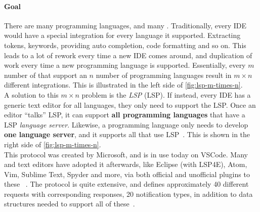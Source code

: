 
\paragraph{Goal}
There are many programming languages, and many .
Traditionally, every \acrshort{IDE} would have a special integration for every language it supported.
Extracting tokens, keywords, providing auto completion, code formatting and so on.
This leads to a lot of rework every time a new \acrshort{IDE} comes around, and duplication of work every time a new programming language is supported.
Essentially, every $m$ number of  that support an $n$ number of programming languages result in $m\times{}n$ different integrations.
This is illustrated in the left side of \cref{fig:lsp-m-times-n}.\\

A solution to this $m\times{}n$ problem is the \textit{\acrlong{LSP}} (\acrshort{LSP}).
If instead, every \acrshort{IDE} has a generic text editor for all languages, they only need to support the \acrshort{LSP}.
Once an editor ``talks'' \acrshort{LSP}, it can support \textbf{all programming languages} that have a \acrshort{LSP} \textit{language server}.
Likewise, a programming language only needs to develop \textbf{one language server}, and it supports all  that use \acrshort{LSP}~\cite{microsoftOverview}.
This is shown in the right side of \cref{fig:lsp-m-times-n}.\\

This protocol was created by Microsoft, and is in use today on \gls{VSCode}.
Many  and text editors have adopted it afterwards, like \gls{Eclipse} (with LSP4E), Atom, Vim, Sublime Text, Spyder and more, via both official and unofficial plugins to these ~\cite{microsoftToolsSupportingLSP}.
The protocol is quite extensive, and defines approximately 40 different requests with corresponding responses, 20 notification types, in addition to data structures needed to support all of these~\cite{microsoftLanguageServerProtocol2021}.

